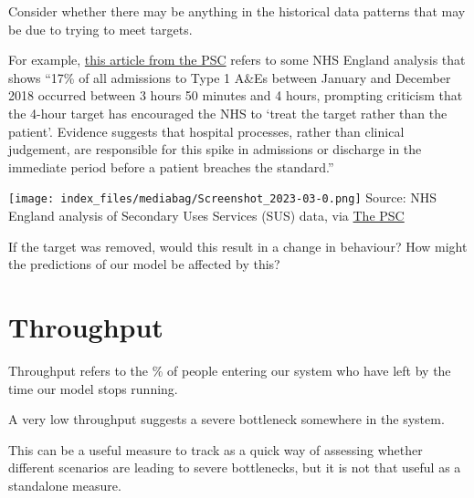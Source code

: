 \documentclass[
  letterpaper,
  DIV=11,
  numbers=noendperiod]{scrreprt}
\begin{document}
\begin{tcolorbox}[enhanced jigsaw, colframe=quarto-callout-warning-color-frame, bottomtitle=1mm, breakable, rightrule=.15mm, coltitle=black, colbacktitle=quarto-callout-warning-color!10!white, opacityback=0, leftrule=.75mm, arc=.35mm, toptitle=1mm, title=\textcolor{quarto-callout-warning-color}{\faExclamationTriangle}\hspace{0.5em}{Warning}, titlerule=0mm, colback=white, toprule=.15mm, bottomrule=.15mm, left=2mm, opacitybacktitle=0.6]

Consider whether there may be anything in the historical data patterns
that may be due to trying to meet targets.

For example,
\href{https://thepsc.co.uk/news-insights/entry/reaffirming-the-nhs-4-hour-ae-target-why-it-matters}{this
article from the PSC} refers to some NHS England analysis that shows
``17\% of all admissions to Type 1 A\&Es between January and December
2018 occurred between 3 hours 50 minutes and 4 hours, prompting
criticism that the 4-hour target has encouraged the NHS to `treat the
target rather than the patient'. Evidence suggests that hospital
processes, rather than clinical judgement, are responsible for this
spike in admissions or discharge in the immediate period before a
patient breaches the standard.''

\texttt{[image: index\_files/mediabag/Screenshot\_2023-03-0.png]} Source:
NHS England analysis of Secondary Uses Services (SUS) data, via
\href{https://thepsc.co.uk/news-insights/entry/reaffirming-the-nhs-4-hour-ae-target-why-it-matters}{The
PSC}

If the target was removed, would this result in a change in behaviour?
How might the predictions of our model be affected by this?

\end{tcolorbox}

\section{Throughput}\label{throughput}

Throughput refers to the \% of people entering our system who have left
by the time our model stops running.

A very low throughput suggests a severe bottleneck somewhere in the
system.

This can be a useful measure to track as a quick way of assessing
whether different scenarios are leading to severe bottlenecks, but it is
not that useful as a standalone measure.
\end{document}
